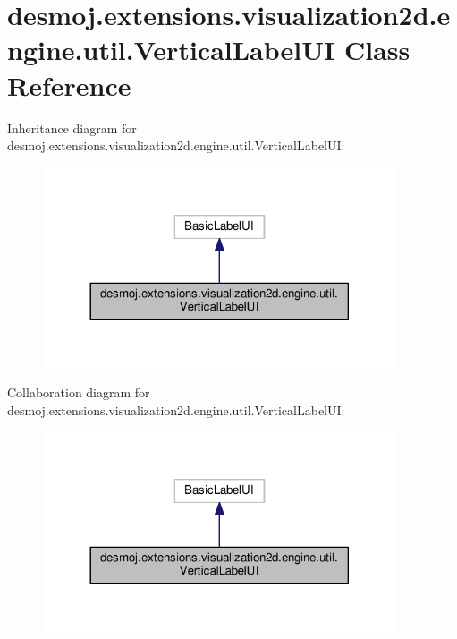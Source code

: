\section{desmoj.\-extensions.\-visualization2d.\-engine.\-util.\-Vertical\-Label\-U\-I Class Reference}
\label{classdesmoj_1_1extensions_1_1visualization2d_1_1engine_1_1util_1_1_vertical_label_u_i}


Inheritance diagram for desmoj.\-extensions.\-visualization2d.\-engine.\-util.\-Vertical\-Label\-U\-I\-:
\nopagebreak
\begin{figure}[H]
\begin{center}
\leavevmode
\includegraphics[width=296pt]{classdesmoj_1_1extensions_1_1visualization2d_1_1engine_1_1util_1_1_vertical_label_u_i__inherit__graph}
\end{center}
\end{figure}


Collaboration diagram for desmoj.\-extensions.\-visualization2d.\-engine.\-util.\-Vertical\-Label\-U\-I\-:
\nopagebreak
\begin{figure}[H]
\begin{center}
\leavevmode
\includegraphics[width=296pt]{classdesmoj_1_1extensions_1_1visualization2d_1_1engine_1_1util_1_1_vertical_label_u_i__coll__graph}
\end{center}
\end{figure}

